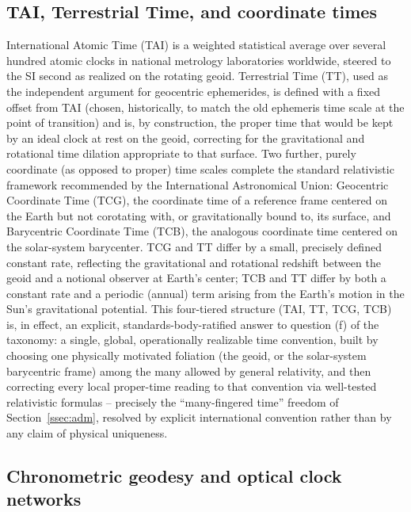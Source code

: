 \documentclass[11pt]{article}
\begin{document}
\subsection{TAI, Terrestrial Time, and coordinate times}

International Atomic Time (TAI) is a weighted statistical average over several hundred atomic clocks in national metrology laboratories worldwide, steered to the SI second as realized on the rotating geoid. Terrestrial Time (TT), used as the independent argument for geocentric ephemerides, is defined with a fixed offset from TAI (chosen, historically, to match the old ephemeris time scale at the point of transition) and is, by construction, the proper time that would be kept by an ideal clock at rest on the geoid, correcting for the gravitational and rotational time dilation appropriate to that surface. Two further, purely coordinate (as opposed to proper) time scales complete the standard relativistic framework recommended by the International Astronomical Union: Geocentric Coordinate Time (TCG), the coordinate time of a reference frame centered on the Earth but not corotating with, or gravitationally bound to, its surface, and Barycentric Coordinate Time (TCB), the analogous coordinate time centered on the solar-system barycenter. TCG and TT differ by a small, precisely defined constant rate, reflecting the gravitational and rotational redshift between the geoid and a notional observer at Earth's center; TCB and TT differ by both a constant rate and a periodic (annual) term arising from the Earth's motion in the Sun's gravitational potential. This four-tiered structure (TAI, TT, TCG, TCB) is, in effect, an explicit, standards-body-ratified answer to question (f) of the taxonomy: a single, global, operationally realizable time convention, built by choosing one physically motivated foliation (the geoid, or the solar-system barycentric frame) among the many allowed by general relativity, and then correcting every local proper-time reading to that convention via well-tested relativistic formulas -- precisely the ``many-fingered time'' freedom of Section~\ref{ssec:adm}, resolved by explicit international convention rather than by any claim of physical uniqueness.

\subsection{Chronometric geodesy and optical clock networks}
\end{document}
